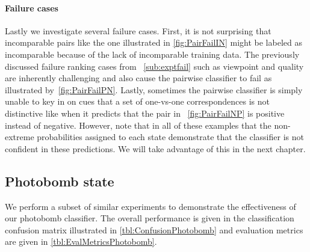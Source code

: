 
        \MatchPrune{}
        
        \paragraph{Failure cases}

        Lastly we investigate several failure cases.
        First, it is not surprising that incomparable pairs like the one illustrated in \cref{fig:PairFailIN}
          might be labeled as incomparable because of the lack of incomparable training data.
        The previously discussed failure ranking cases from ~\cref{sub:exptfail} such as viewpoint and quality
          are inherently challenging and also cause the pairwise classifier to fail as illustrated
          by~\cref{fig:PairFailPN}.
        Lastly, sometimes the pairwise classifier is simply unable to key in on cues that a set of one-vs-one
          correspondences is not distinctive like when it predicts that the pair in ~\cref{fig:PairFailNP} is
          positive instead of negative.
        However, note that in all of these examples that the non-extreme probabilities assigned to each state
          demonstrate that the classifier is not confident in these predictions.
        We will take advantage of this in the next chapter.
        




        \FloatBarrier{}


    \FloatBarrier{}
    \subsection{Photobomb state}
        We perform a subset of similar experiments to demonstrate the effectiveness of our photobomb classifier.
        The overall performance is given in the classification confusion matrix illustrated in
          \cref{tbl:ConfusionPhotobomb} and evaluation metrics are given in \cref{tbl:EvalMetricsPhotobomb}.


